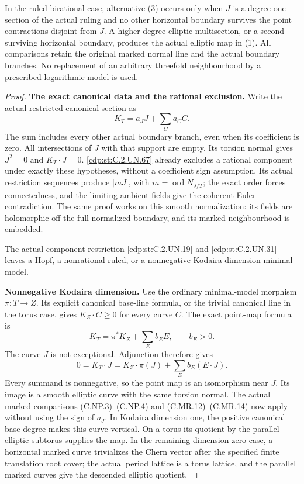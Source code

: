 \begin{proposition}
In the ruled birational case, alternative (3) occurs
only when \(J\) is a degree-one section of the actual
ruling and no other horizontal boundary survives the
point contractions disjoint from \(J\). A higher-degree
elliptic multisection, or a second surviving horizontal
boundary, produces the actual elliptic map in (1).
All comparisons retain the original marked normal line
and the actual boundary branches. No replacement of an
arbitrary threefold neighbourhood by a prescribed
logarithmic model is used.
\end{proposition}

\begin{proof}
\par\medskip\noindent\textbf{The exact canonical data and the rational exclusion.}
Write the actual restricted canonical section as
\[
              K_T=a_JJ+\sum_C a_CC.
 \tag{C.TI.5}\label{cdp:eq:C.TI.5}
\]
The sum includes every other actual boundary branch,
even when its coefficient is zero. All intersections
of \(J\) with that support are empty. Its torsion
normal gives \(J^2=0\) and \(K_T\cdot J=0\).
\ref{cdp:st:C.2.UN.67} already excludes a rational component under
exactly these hypotheses, without a coefficient
sign assumption. Its actual restriction sequences
produce \(|mJ|\), with
\(m=\operatorname{ord}N_{J/T}\); the exact order
forces connectedness, and the limiting ambient
fields give the coherent-Euler contradiction.
The same proof works on this smooth normalization:
its fields are holomorphic off the full normalized
boundary, and its marked neighbourhood is embedded.

The actual component restriction \ref{cdp:st:C.2.UN.19} and \ref{cdp:st:C.2.UN.31}
leaves a Hopf, a nonrational ruled, or a
nonnegative-Kodaira-dimension minimal model.

\par\medskip\noindent\textbf{Nonnegative Kodaira dimension.}
Use the ordinary minimal-model morphism
\(\pi:T\to Z\). Its explicit canonical base-line
formula, or the trivial canonical line in the
torus case, gives \(K_Z\cdot C\ge0\) for every
curve \(C\). The exact point-map formula is
\[
 K_T=\pi^*K_Z+\sum_E b_EE,\qquad b_E>0.
 \tag{C.TI.6}\label{cdp:eq:C.TI.6}
\]
The curve \(J\) is not exceptional. Adjunction
therefore gives
\[
 0=K_T\cdot J
   =K_Z\cdot\pi(J)+\sum_E b_E(E\cdot J).
 \tag{C.TI.7}\label{cdp:eq:C.TI.7}
\]
Every summand is nonnegative, so the point map is
an isomorphism near \(J\). Its image is a smooth
elliptic curve with the same torsion normal.
The actual marked comparisons (C.NP.3)--(C.NP.4)
and (C.MR.12)--(C.MR.14) now apply without using
the sign of \(a_J\). In Kodaira dimension one,
the positive canonical base degree makes this
curve vertical. On a torus its quotient by the
parallel elliptic subtorus supplies the map.
In the remaining dimension-zero case, a
horizontal marked curve trivializes the Chern
vector after the specified finite translation
root cover; the actual period lattice is a
torus lattice, and the parallel marked curves
give the descended elliptic quotient.


\end{proof}
